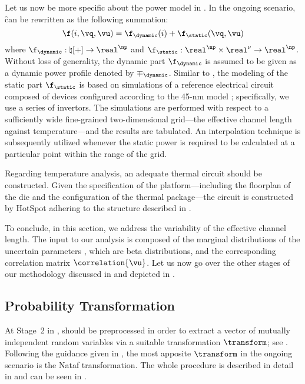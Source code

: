 Let us now be more specific about the power model in .
In the ongoing scenario, \f can be rewritten as the following summation:
\[
  \f(i, \vq, \vu) = \f_\dynamic(i) + \f_\static(\vq, \vu)
\]
where $\f_\dynamic: \natural[+] \to \real^\np$ and $\f_\static: \real^\np \times
\real^\nu \to \real^\np$. Without loss of generality, the dynamic part
$\f_\dynamic$ is assumed to be given as a dynamic power profile denoted by
$\mp_\dynamic$. Similar to , the modeling of the static part
$\f_\static$ is based on  simulations of a reference electrical
circuit composed of  devices \cite{bsim} configured according to the
45-nm   model \cite{ptm}; specifically, we use a series of
 invertors. The simulations are performed with respect to a
sufficiently wide fine-grained two-dimensional grid---the effective channel
length against temperature---and the results are tabulated. An interpolation
technique is subsequently utilized whenever the static power is required to be
calculated at a particular point within the range of the grid.

Regarding temperature analysis, an adequate thermal  circuit should be
constructed. Given the specification of the platform---including the floorplan
of the die and the configuration of the thermal package---the circuit is
constructed by HotSpot \cite{skadron2003} adhering to the structure described in
.

To conclude, in this section, we address the variability of the effective
channel length. The input to our analysis is composed of the marginal
distributions of the uncertain parameters \vu, which are beta distributions, and
the corresponding correlation matrix $\correlation{\vu}$. Let us now go over the
other stages of our methodology discussed in 
and depicted in .

\subsection{Probability Transformation}

At Stage~2 in , \vu should be preprocessed in order to
extract a vector of mutually independent random variables \vz via a suitable
transformation $\transform$; see . Following the
guidance given in , the most apposite $\transform$ in
the ongoing scenario is the Nataf transformation. The whole procedure is
described in detail in  and can be seen in
.

